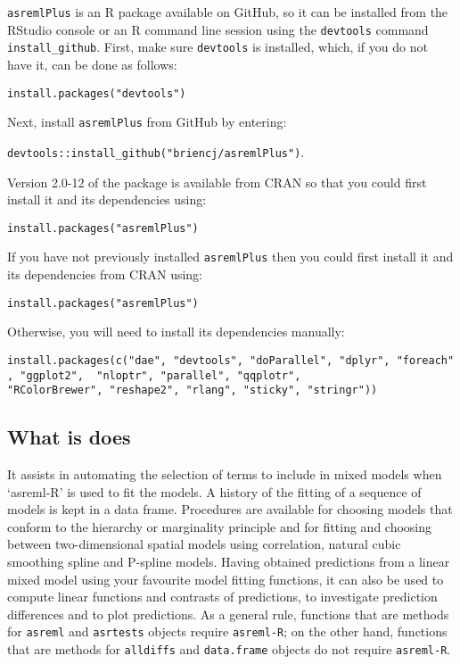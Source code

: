 \documentclass[
]{article}
\begin{document}
\texttt{asremlPlus} is an R package available on GitHub, so it can be
installed from the RStudio console or an R command line session using
the \texttt{devtools} command \texttt{install\_github}. First, make sure
\texttt{devtools} is installed, which, if you do not have it, can be
done as follows:

\texttt{install.packages("devtools")}

Next, install \texttt{asremlPlus} from GitHub by entering:

\texttt{devtools::install\_github("briencj/asremlPlus")}.

Version 2.0-12 of the package is available from CRAN so that you could
first install it and its dependencies using:

\texttt{install.packages("asremlPlus")}

If you have not previously installed \texttt{asremlPlus} then you could
first install it and its dependencies from CRAN using:

\texttt{install.packages("asremlPlus")}

Otherwise, you will need to install its dependencies manually:

\texttt{install.packages(c("dae",\ "devtools",\ "doParallel",\ "dplyr",\ "foreach",\ "ggplot2",\ \ "nloptr",\ "parallel",\ "qqplotr",}
\texttt{"RColorBrewer",\ "reshape2",\ "rlang",\ "sticky",\ "stringr"))}

\subsection{What is does}\label{what-is-does}

It assists in automating the selection of terms to include in mixed
models when `asreml-R' is used to fit the models. A history of the
fitting of a sequence of models is kept in a data frame. Procedures are
available for choosing models that conform to the hierarchy or
marginality principle and for fitting and choosing between
two-dimensional spatial models using correlation, natural cubic
smoothing spline and P-spline models. Having obtained predictions from a
linear mixed model using your favourite model fitting functions, it can
also be used to compute linear functions and contrasts of predictions,
to investigate prediction differences and to plot predictions. As a
general rule, functions that are methods for \texttt{asreml} and
\texttt{asrtests} objects require \texttt{asreml-R}; on the other hand,
functions that are methods for \texttt{alldiffs} and \texttt{data.frame}
objects do not require \texttt{asreml-R}.
\end{document}
